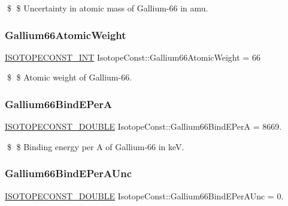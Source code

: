 \$ \$ Uncertainty in atomic mass of Gallium-\/66 in amu. \mbox{\label{group___isotope_const-_gallium-_ga66_gaafdd4c5efa23ffe99439d38614dbd574}} 
\subsubsection{\texorpdfstring{Gallium66\+Atomic\+Weight}{Gallium66AtomicWeight}}
{\footnotesize\ttfamily \mbox{\hyperlink{group___isotope_const-_macros_ga5f18360b3e99483a35c32d789e62621c}{I\+S\+O\+T\+O\+P\+E\+C\+O\+N\+S\+T\+\_\+\+I\+NT}} Isotope\+Const\+::\+Gallium66\+Atomic\+Weight = 66}

\$ \$ Atomic weight of Gallium-\/66. \mbox{\label{group___isotope_const-_gallium-_ga66_gadc5544198b4cacec288851dfa9e181bf}} 
\subsubsection{\texorpdfstring{Gallium66\+Bind\+E\+PerA}{Gallium66BindEPerA}}
{\footnotesize\ttfamily \mbox{\hyperlink{group___isotope_const-_macros_ga8f45a7272ce02c0b4c65c44636ed719a}{I\+S\+O\+T\+O\+P\+E\+C\+O\+N\+S\+T\+\_\+\+D\+O\+U\+B\+LE}} Isotope\+Const\+::\+Gallium66\+Bind\+E\+PerA = 8669.}

\$ \$ Binding energy per A of Gallium-\/66 in keV. \mbox{\label{group___isotope_const-_gallium-_ga66_gaff7aa789532d6bfd7b790e1e37764369}} 
\subsubsection{\texorpdfstring{Gallium66\+Bind\+E\+Per\+A\+Unc}{Gallium66BindEPerAUnc}}
{\footnotesize\ttfamily \mbox{\hyperlink{group___isotope_const-_macros_ga8f45a7272ce02c0b4c65c44636ed719a}{I\+S\+O\+T\+O\+P\+E\+C\+O\+N\+S\+T\+\_\+\+D\+O\+U\+B\+LE}} Isotope\+Const\+::\+Gallium66\+Bind\+E\+Per\+A\+Unc = 0.}

